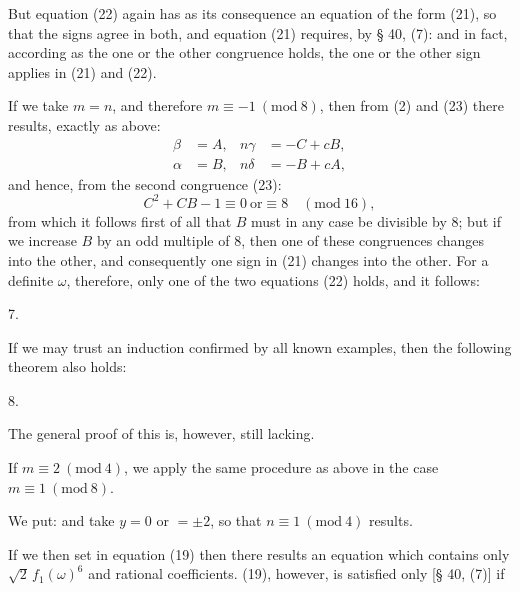 
But equation (22) again has as its consequence an equation of the form (21), so that the signs agree in both, and equation (21) requires, by § 40, (7):
and in fact, according as the one or the other congruence holds, the one or the other sign applies in (21) and (22).

If we take $m = n$, and therefore $m \equiv -1\ (\mathrm{mod}\ 8)$, then from (2) and (23) there results, exactly as above:
\[
\begin{aligned}
\beta &= A, & n\gamma &= -C + cB, \\
\alpha &= B, & n\delta &= -B + cA,
\end{aligned}
\]
and hence, from the second congruence (23):
\[
C^2 + CB - 1 \equiv 0 \ \text{or} \equiv 8 \quad (\mathrm{mod}\ 16),
\]
from which it follows first of all that $B$ must in any case be divisible by 8; but if we increase $B$ by an odd multiple of 8, then one of these congruences changes into the other, and consequently one sign in (21) changes into the other. For a definite $\omega$, therefore, only one of the two equations (22) holds, and it follows:

7. 

If we may trust an induction confirmed by all known examples, then the following theorem also holds:

8. 

The general proof of this is, however, still lacking.

If $m \equiv 2\ (\mathrm{mod}\ 4)$, we apply the same procedure as above in the case $m \equiv 1\ (\mathrm{mod}\ 8)$.

We put:
and take $y = 0$ or $= \pm 2$, so that $n \equiv 1\ (\mathrm{mod}\ 4)$ results. %

If we then set in equation (19)
then there results an equation which contains only $\sqrt{2}\, f_1(\omega)^6$ and rational coefficients. (19), however, is satisfied only [§ 40, (7)] if
